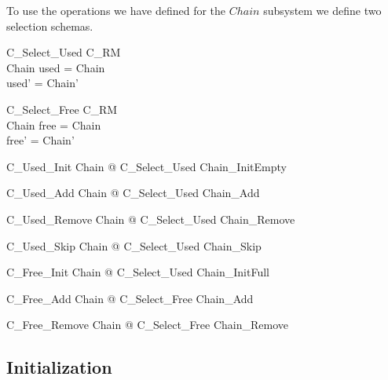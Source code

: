 \documentclass{article}
\begin{document}
To use the operations we have defined for the $Chain$ subsystem we define
two selection schemas.

\begin{schema}{C\_Select\_Used}
	\Delta C\_RM \\
	\Delta Chain 
\where
	used = \theta Chain \\
	used' = \theta Chain' \\
\end{schema}

\begin{schema}{C\_Select\_Free}
	\Delta C\_RM \\
	\Delta Chain 
\where
	free = \theta Chain \\
	free' = \theta Chain'
\end{schema}
	
\begin{zed}
	C\_Used\_Init  \exists \Delta Chain @ C\_Select\_Used \land Chain\_InitEmpty
\end{zed}

\begin{zed}
	C\_Used\_Add  \exists \Delta Chain @ C\_Select\_Used \land Chain\_Add
\end{zed}

\begin{zed}
	C\_Used\_Remove  \exists \Delta Chain @ C\_Select\_Used \land Chain\_Remove
\end{zed}

\begin{zed}
	C\_Used\_Skip  \exists \Delta Chain @ C\_Select\_Used \land Chain\_Skip
\end{zed}

\begin{zed}
	C\_Free\_Init  \exists \Delta Chain @ C\_Select\_Used \land Chain\_InitFull
\end{zed}

\begin{zed}
	C\_Free\_Add  \exists \Delta Chain @ C\_Select\_Free \land Chain\_Add
\end{zed}

\begin{zed}
	C\_Free\_Remove  \exists \Delta Chain @ C\_Select\_Free \land Chain\_Remove
\end{zed}

\subsection{Initialization}
\end{document}
